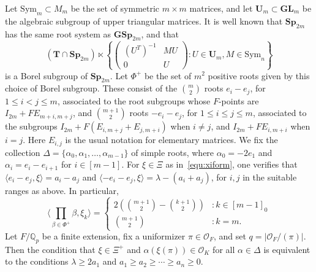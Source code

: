 \documentclass[11pt,a4paper]{amsart}
\theoremstyle{plain}
\theoremstyle{remark}
\newcommand{\Q}{\mathbb{Q}}
\begin{document}
Let $\mathrm{Sym}_m \subset M_m$ be the set of symmetric $m \times m$ matrices, and let $\mathbf{U}_m \subset \mathbf{GL}_m$ be the algebraic subgroup of upper triangular matrices.  It is well known that $\mathbf{Sp}_{2m}$ has the same root system as $\mathbf{GSp}_{2m}$, and that
$$ (\mathbf{T} \cap \mathbf{Sp}_{2m}) \ltimes \left\{ \left( \begin{array}{cc} (U^T)^{-1} & MU \\ 0 & U \end{array} \right) : U \in \mathbf{U}_m, M \in \mathrm{Sym}_n \right\}$$
is a Borel subgroup of $\mathbf{Sp}_{2m}$.  Let $\Phi^+$ be the set of $m^2$ positive roots given by this choice of Borel subgroup.  These consist of the $\binom{m}{2}$ roots $e_i - e_j$, for $1 \leq i < j \leq m$, associated to the root subgroups whose $F$-points are $I_{2m} + FE_{m+i,m+j}$, and $\binom{m+1}{2}$ roots $-e_i - e_j$, for $1 \leq i \leq j \leq m$, associated to the subgroups $I_{2m} + F(E_{i,m+j} + E_{j,m+i})$ when $i \neq j$, and $I_{2m} + FE_{i,m+i}$ when $i = j$.  Here $E_{i,j}$ is the usual notation for elementary matrices.  We fix the collection $\Delta = \{ \alpha_0, \alpha_1, \dots, \alpha_{m-1} \}$ of simple roots, where $\alpha_0 = -2e_1$ and $\alpha_i = e_i - e_{i+1}$ for $i \in [m-1]$.  For $\xi \in \Xi$ as in~\eqref{equ:xiform}, one verifies that $\langle e_i - e_j, \xi \rangle = a_i - a_j$ and $\langle -e_i - e_j, \xi \rangle = \lambda - (a_i + a_j)$, for $i,j$ in the suitable ranges as above.  In particular,
\begin{equation} \label{equ:root.pairing}
\langle \prod_{\beta \in \Phi^+} \beta, \xi_k \rangle =
\begin{cases}
2 \left( \binom{m+1}{2} - \binom{k+1}{2} \right) &: k \in [m-1]_0 \\
\binom{m+1}{2} &: k = m.
\end{cases}
\end{equation}
Let $F/\Q_p$ be a finite extension, fix a uniformizer $\pi \in \mathcal{O}_F$, and set $q = | \mathcal{O}_F / (\pi) |$.  Then the condition that $\xi \in \Xi^+$ and $\alpha(\xi(\pi)) \in \mathcal{O}_K$ for all $\alpha \in \Delta$ is equivalent to the conditions $\lambda \geq 2a_1$ and $a_1 \geq a_2 \geq \cdots \geq a_n \geq 0$.  
\end{document}
